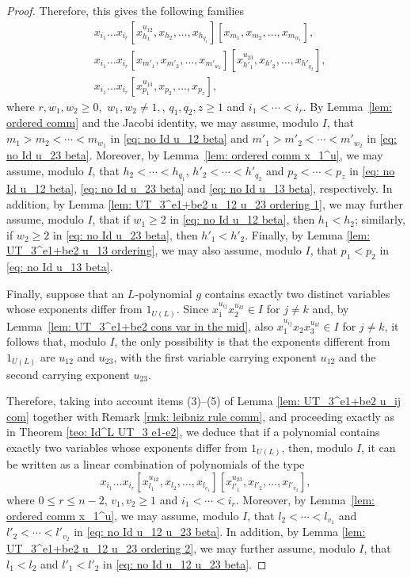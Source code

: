 \documentclass[a4paper,reqno]{amsart}
\theoremstyle{definition}
\numberwithin{equation}{section}
\numberwithin{theorem}{section}
\begin{document}
\begin{proof}
Therefore, this gives the following families
     \begin{align}
&x_{i_{1}}\dots x_{i_{r}}[x_{h_1}^{u_{12}},x_{h_2},\dots,x_{h_{q_1}}][x_{m_1},x_{m_2},\dots,x_{m_{w_1}}],\label{eq: no Id u_12 beta}\\
&x_{i_{1}}\dots x_{i_{r}}[x_{m'_1},x_{m'_2},\dots,x_{m'_{w_2}}][x_{h'_1}^{u_{23}},x_{h'_2},\dots,x_{h'_{q_2}}], \label{eq: no Id u_23 beta}\\
&x_{i_{1}}\dots x_{i_{r}}[x_{p_1}^{u_{13}},x_{p_2},\dots,x_{p_z}], \label{eq: no Id u_13 beta} 
\end{align}
where $r, w_1, w_2 \geq 0,$ $w_1,w_2\neq 1,$, $q_1,q_2,z\geq 1$ and  $i_1< \cdots < i_r$. 
By Lemma~\ref{lem: ordered comm} and the Jacobi identity, we may assume, modulo $I$, that $m_1>m_2< \cdots < m_{w_1}$ in \eqref{eq: no Id u_12 beta} and $m'_1>m'_2< \cdots < m'_{w_2}$ in \eqref{eq: no Id u_23 beta}.
Moreover, by Lemma~\ref{lem: ordered comm x_1^u}, we may assume, modulo $I$, that $h_2< \cdots <h_{q_1}$, $h'_2< \cdots <h'_{q_2}$ and $p_2<\cdots <p_z$ in \eqref{eq: no Id u_12 beta}, \eqref{eq: no Id u_23 beta} and \eqref{eq: no Id u_13 beta}, respectively.  In addition, by Lemma \ref{lem: UT_3^e1+be2 u_12 u_23 ordering 1}, we may further assume, modulo $I$, that if $w_1\geq 2$ in \eqref{eq: no Id u_12 beta}, then $h_1<h_2$; similarly, if $w_2\geq 2$ in \eqref{eq: no Id u_23 beta}, then $h'_1<h'_2.$ Finally, by Lemma \ref{lem: UT_3^e1+be2 u_13 ordering}, we may also assume, modulo $I$, that $p_1<p_2$ in \eqref{eq: no Id u_13 beta}.


Finally, suppose that an $L$-polynomial $g$ contains exactly two distinct variables whose exponents differ from $1_{U(L)}$. Since $x_1^{u_{ij}}x_2^{u_{kl}} \in I$ for $j\neq k$ and, by Lemma~\ref{lem: UT_3^e1+be2 cons var in the mid}, also $x_1^{u_{ij}}x_2 x_3^{u_{kl}} \in I$ for $j\neq k$, it follows that, modulo $I$, the only possibility is that the exponents different from $1_{U(L)}$ are $u_{12}$ and $u_{23}$, with the first variable carrying exponent $u_{12}$ and the second carrying exponent $u_{23}$.


Therefore, taking into account items (3)–(5) of Lemma \ref{lem: UT_3^e1+be2 u_ij com} together with Remark \ref{rmk: leibniz rule comm}, and proceeding exactly as in Theorem \ref{teo: Id^L UT_3 e1-e2}, we deduce that if a polynomial  contains exactly two variables whose exponents differ from $1_{U(L)}$, then, modulo $I$, it can be written as a linear combination of polynomials of the type
     \begin{equation}\label{eq: no Id u_12 u_23 beta}
           x_{i_{1}}\dots x_{i_{r}}[x_{l_1}^{u_{12}},x_{l_2},\dots,x_{l_{v_1}}][x_{l'_1}^{u_{23}},x_{l'_2},\dots,x_{l'_{v_2}}],
     \end{equation}
where $0\leq r\leq n-2$, $ v_1,v_2 \geq 1$ and $i_1<\cdots < i_r$. Moreover, by Lemma~\ref{lem: ordered comm x_1^u}, we may assume, modulo $I$, that $l_2< \cdots <l_{v_1}$ and $l'_2< \cdots <l'_{v_2}$ in \eqref{eq: no Id u_12 u_23 beta}. In addition, by Lemma \ref{lem: UT_3^e1+be2 u_12 u_23 ordering 2}, we may further assume, modulo $I$, that $l_1<l_2$  and $l'_1<l'_2$ in  \eqref{eq: no Id u_12 u_23 beta}. 


\end{proof}
\end{document}
